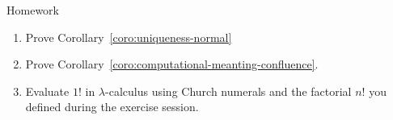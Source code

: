 \begin{frame}{Homework}
  \begin{enumerate}
    \item Prove Corollary~\ref{coro:uniqueness-normal}
    \item Prove Corollary~\ref{coro:computational-meanting-confluence}.
    \item Evaluate $1!$ in $\lambda$-calculus
      using Church numerals and the factorial $n!$ you defined during the exercise session.
  \end{enumerate}
\end{frame}
%
%


%  
%   


